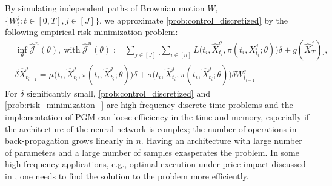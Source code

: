 \documentclass{article}
\numberwithin{equation}{section}
\begin{document}
By simulating independent paths of Brownian motion  $W$, $\{W_t^j:t\in[0,T], j\in[J]\}$, we approximate \eqref{prob:control_discretized} by the following empirical risk  minimization problem:
\begin{equation}\label{prob:risk_minimization_}
        \begin{split}
        & \inf_\theta\hat{\mathcal{J}}^n(\theta),~\textrm{with}~\hat{\mathcal{J}}^n(\theta):=\sum_{j\in[J]}\bigg[\sum_{i\in[n]}L\big(t_i,\hat X^{\theta}_{t_i}, \pi({t_i},X^{j}_{t_i};\theta) \big) \delta + g(\hat{X}_T^j)\bigg],\\
        &\delta \hat{X}^j_{t_{i+1}}=\mu\big(t_i,\hat{X}_{t_i}^j,\pi(t_i,\hat{X}_{t_i}^j;\theta)\big)\delta +\sigma\big(t_i,\hat{X}_{t_i}^j, \pi(t_i,\hat{X}_{t_i}^j;\theta)\big) \delta W^j_{t_{i+1}}
        \end{split}
\end{equation}
For $\delta$ significantly small,  \eqref{prob:control_discretized} and \eqref{prob:risk_minimization_} are  high-frequency discrete-time problems and the implementation of PGM can loose efficiency in the time and memory, especially if the architecture of the neural network is complex; the number of operations in back-propagation grows linearly in $n$. Having an architecture with large number of parameters and a large number of samples exasperates the problem. In some high-frequency applications, e.g., optimal execution under price impact discussed in \citet{KW2023book}, one needs to find the solution to the problem more efficiently.
\end{document}
